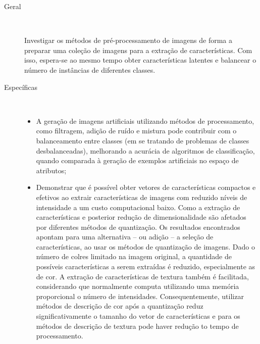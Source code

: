 \begin{description}
\item[Geral] \

Investigar os métodos de pré-processamento de imagens de forma a preparar uma coleção de imagens para a extração de características. Com isso, espera-se ao mesmo tempo obter características latentes e balancear o número de instâncias de diferentes classes.

\item[Específicas] \

  \begin{itemize}
    \item A geração de imagens artificiais utilizando métodos de processamento, como filtragem, adição de ruído e mistura pode contribuir com o balanceamento entre classes (em se tratando de problemas de classes desbalanceadas), melhorando a acurácia de algoritmos de classificação, quando comparada à geração de exemplos artificiais no espaço de atributos;
    \item

    Demonstrar que é possível obter vetores de características compactos e efetivos ao extrair características de imagens com reduzido níveis de intensidade a um custo computacional baixo. Como a extração de características e posterior redução de dimensionalidade são afetados por diferentes métodos de quantização. Os resultados encontrados apontam para uma alternativa -- ou adição -- a seleção de características, ao usar os métodos de quantização de imagens. Dado o número de colres limitado na imagem original, a quantidade de possíveis características a serem extraídas é reduzido, especialmente as de cor. A extração de características de textura também é facilitada, considerando que normalmente computa utilizando uma memória proporcional o número de intensidades. Consequentemente, utilizar métodos de descrição de cor após a quantização reduz significativamente o tamanho do vetor de características e para os métodos de descrição de textura pode haver redução to tempo de processamento.

  \end{itemize}
\end{description}

